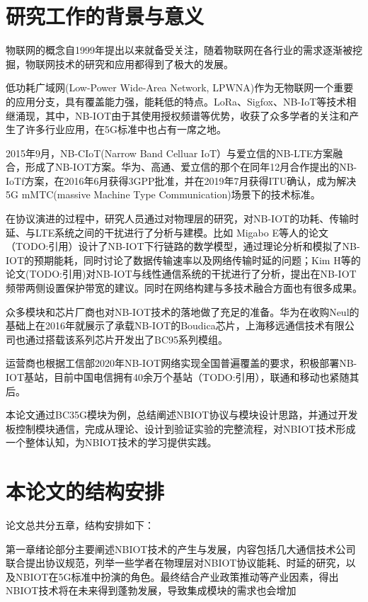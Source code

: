 \thesischapterexordium

\section{研究工作的背景与意义}

物联网的概念自1999年提出以来就备受关注，随着物联网在各行业的需求逐渐被挖掘，物联网技术的研究和应用都得到了极大的发展。


低功耗广域网(Low-Power Wide-Area Network, LPWNA)作为无物联网一个重要的应用分支，具有覆盖能力强，能耗低的特点。LoRa、Sigfox、NB-IoT等技术相继涌现，其中，NB-IOT由于其使用授权频谱等优势，收获了众多学者的关注和产生了许多行业应用，在5G标准中也占有一席之地。

2015年9月，NB-CIoT(Narrow Band Celluar IoT）与爱立信的NB-LTE方案融合，形成了NB-IOT方案。华为、高通、爱立信的那个在同年12月合作提出的NB-IoTf方案，在2016年6月获得3GPP批准，并在2019年7月获得ITU确认，成为解决5G mMTC(massive Machine Type Communication)场景下的技术标准。

在协议演进的过程中，研究人员通过对物理层的研究，对NB-IOT的功耗、传输时延、与LTE系统之间的干扰进行了分析与建模。比如 Migabo E等人的论文（TODO:引用）设计了NB-IOT下行链路的数学模型，通过理论分析和模拟了NB-IOT的预期能耗，同时讨论了数据传输速率以及网络传输时延的问题；Kim H等的论文(TODO:引用)对NB-IOT与线性通信系统的干扰进行了分析，提出在NB-IOT频带两侧设置保护带宽的建议。同时在网络构建与多技术融合方面也有很多成果。

众多模块和芯片厂商也对NB-IOT技术的落地做了充足的准备。华为在收购Neul的基础上在2016年就展示了承载NB-IOT的Boudica芯片，上海移远通信技术有限公司也通过搭载该系列芯片开发出了BC95系列模组。

运营商也根据工信部2020年NB-IOT网络实现全国普遍覆盖的要求，积极部署NB-IOT基站，目前中国电信拥有40余万个基站（TODO:引用），联通和移动也紧随其后。

本论文通过BC35G模块为例，总结阐述NBIOT协议与模块设计思路，并通过开发板控制模块通信，完成从理论、设计到验证实验的完整流程，对NBIOT技术形成一个整体认知，为NBIOT技术的学习提供实践。

\section{本论文的结构安排}

论文总共分五章，结构安排如下：

第一章绪论部分主要阐述NBIOT技术的产生与发展，内容包括几大通信技术公司联合提出协议规范，列举一些学者在物理层对NBIOT协议能耗、时延的研究，以及NBIOT在5G标准中扮演的角色。最终结合产业政策推动等产业因素，得出NBIOT技术将在未来得到蓬勃发展，导致集成模块的需求也会增加

